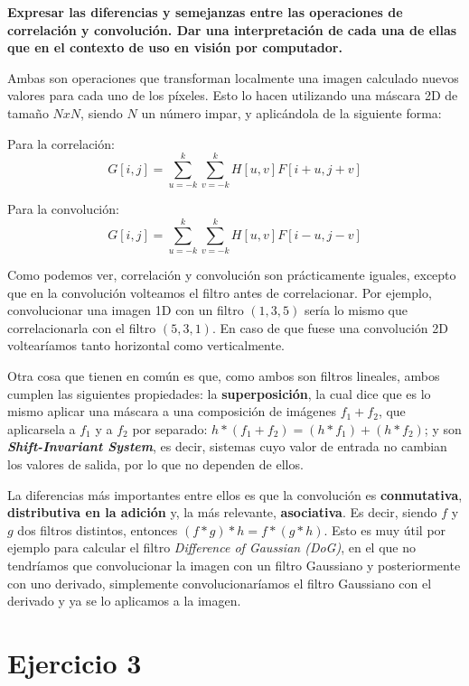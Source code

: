 \documentclass[11pt,a4paper]{article}
\begin{document}
\textbf{Expresar las diferencias y semejanzas entre las operaciones de correlación y convolución. Dar una interpretación
de cada una de ellas que en el contexto de uso en visión por computador.}

Ambas son operaciones que transforman localmente una imagen calculado nuevos valores para cada uno de los píxeles. Esto lo hacen
utilizando una máscara 2D de tamaño $NxN$, siendo $N$ un número impar, y aplicándola de la siguiente forma:

Para la correlación:
\begin{equation}
G[i,j]= \sum_{u=-k}^{k} \sum_{v=-k}^{k} H[u,v]F[i+u,j+v]
\end{equation}

Para la convolución:
\begin{equation}
G[i,j]= \sum_{u=-k}^{k} \sum_{v=-k}^{k} H[u,v]F[i-u,j-v]
\end{equation}

Como podemos ver, correlación y convolución son prácticamente iguales, excepto que en la convolución volteamos el filtro antes de
correlacionar. Por ejemplo, convolucionar una imagen 1D con un filtro $(1,3,5)$ sería lo mismo que correlacionarla con el filtro
$(5,3,1)$. En caso de que fuese una convolución 2D voltearíamos tanto horizontal como verticalmente.

Otra cosa que tienen en común es que, como ambos son filtros lineales, ambos cumplen las siguientes propiedades: la \textbf{
superposición}, la cual dice que es lo mismo aplicar una máscara a una composición de imágenes $f_1+f_2$, que aplicarsela a
$f_1$ y a $f_2$ por separado: $h*(f_1 + f_2) = (h*f_1) + (h*f_2)$; y son \textbf{\textit{Shift-Invariant System}}, es decir,
sistemas cuyo valor de entrada no cambian los valores de salida, por lo que no dependen de ellos.

La diferencias más importantes entre ellos es que la convolución es \textbf{conmutativa}, \textbf{distributiva en la adición} y, la
más relevante, \textbf{asociativa}. Es decir, siendo $f$ y $g$ dos filtros distintos, entonces $(f * g)*h = f*(g * h)$. Esto es muy
útil por ejemplo para calcular el filtro \textit{Difference of Gaussian (DoG)}, en el que no tendríamos que convolucionar la imagen
con un filtro Gaussiano y posteriormente con uno derivado, simplemente convolucionaríamos el filtro Gaussiano con el derivado y ya se
lo aplicamos a la imagen.


\section*{Ejercicio 3}
\end{document}
